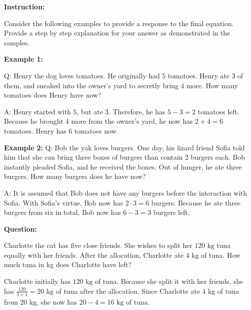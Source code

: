 \documentclass[../../../main.tex]{subfiles}
\begin{document}
\begin{basicbox}
\textbf{Instruction:}
\vspace{0.3\baselineskip}

Consider the following examples to provide a response to the
final equation. Provide a step by step explanation for your
answer as demonstrated in the samples.
\vspace{0.4\baselineskip}

\textbf{Example 1:}
\vspace{0.3\baselineskip}

Q: Henry the dog loves tomatoes. He originally had $5$ tomatoes.
Henry ate $3$ of them, and sneaked into the owner's yard to
secretly bring $4$ more. How many tomatoes does Henry have now?
\vspace{0.2\baselineskip}

A: Henry started with $5$, but ate $3$. Therefore, he has
$5 - 3 = 2$ tomatoes left. Because he brought 4 more from the
owner's yard, he now has $2 + 4 = 6$ tomatoes. Henry has $6$
tomatoes now.
\vspace{0.4\baselineskip}

\textbf{Example 2:}
\vspace{0.3\baselineskip}
Q: Bob the yak loves burgers. One day, his lizard friend Sofia
told him that she can bring three boxes of burgers than contain
2 burgers each. Bob instantly pleaded Sofia, and he received the
boxes. Out of hunger, he ate three burgers. How many burgers
does he have now?
\vspace{0.2\baselineskip}

A: It is assumed that Bob does not have any burgers before the
interaction with Sofia. With Sofia's virtue, Bob now has
$2 \cdot 3 = 6$ burgers. Because he ate three burgers from
six in total, Bob now has $6 - 3 = 3$ burgers left.
\vspace{0.4\baselineskip}

\textbf{Question:}
\vspace{0.3\baselineskip}

Charlotte the cat has five close friends. She wishes to split
her $120 \text{ kg}$ tuna equally with her friends. After the
allocation, Charlotte ate $4 \text{ kg}$ of tuna. How much
tuna in kg does Charlotte have left?
\end{basicbox}

\begin{outputbox}
Charlotte initially has $120 \text{ kg}$ of tuna. Because she
split it with her friends, she has $\frac{120}{5 + 1} = 20
\text{ kg}$ of tuna after the allocation. Since Charlotte ate
$4 \text{ kg}$ of tuna from $20 \text{ kg}$, she now has
$20 - 4 = 16 \text{ kg}$ of tuna.
\end{outputbox}
\end{document}
